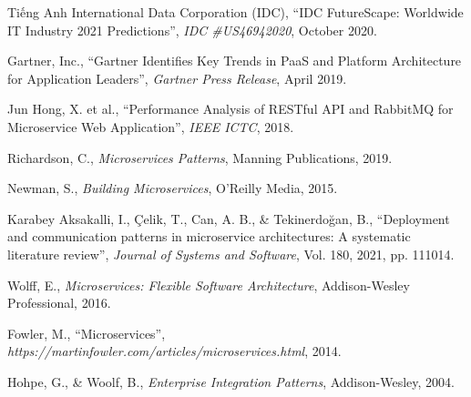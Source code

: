 \documentclass{uetgraduation}
\begin{document}
\begin{contentlisting}
    \tableofcontents
    \listoffigures
    \listoftables
\end{contentlisting}








\begin{thebibliography}{9}

    \begin{bibsection}{Tiếng Anh}
        International Data Corporation (IDC),
        ``IDC FutureScape: Worldwide IT Industry 2021 Predictions'',
        \textit{IDC \#US46942020},
        October 2020.

        Gartner, Inc.,
        ``Gartner Identifies Key Trends in PaaS and Platform Architecture for Application Leaders'',
        \textit{Gartner Press Release},
        April 2019.

        Jun Hong, X. et al.,
        ``Performance Analysis of RESTful API and RabbitMQ for Microservice Web Application'',
        \textit{IEEE ICTC},
        2018.

        Richardson, C.,
        \textit{Microservices Patterns},
        Manning Publications, 2019.

        Newman, S.,
        \textit{Building Microservices},
        O'Reilly Media, 2015.

        Karabey Aksakalli, I., Çelik, T., Can, A. B., \& Tekinerdoğan, B.,
        ``Deployment and communication patterns in microservice architectures: A systematic literature review'',
        \textit{Journal of Systems and Software},
        Vol. 180, 2021, pp. 111014.

        Wolff, E.,
        \textit{Microservices: Flexible Software Architecture},
        Addison-Wesley Professional, 2016.

        Fowler, M.,
        ``Microservices'',
        \textit{https://martinfowler.com/articles/microservices.html},
        2014.

        Hohpe, G., \& Woolf, B.,
        \textit{Enterprise Integration Patterns},
        Addison-Wesley, 2004.


\end{bibsection}
\end{thebibliography}
\end{document}

